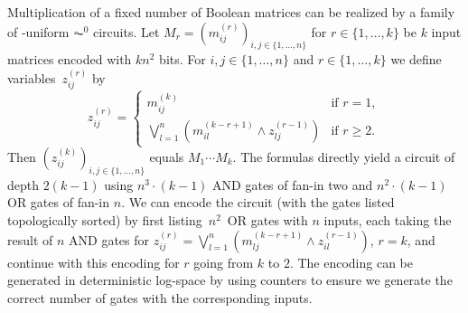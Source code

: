 \begin{example} \label{prelim:circuit:ex:AC0mtx}
	Multiplication of a fixed number of Boolean matrices can be realized by a family of \LOGSPACE-uniform 
	$\AC^0$ circuits.
	Let $M_r = (m_{ij}^{(r)})_{i,j\in \{1,\ldots,n\}}$
	for $r \in \{1,\ldots,k\}$ be $k$ input matrices
	encoded with $kn^2$ bits.	
	For $i,j \in \{1,\ldots,n\}$ and  $r \in \{1,\ldots,k\}$ 
	we define variables~$z_{ij}^{(r)}$
	by 
	\[
	z_{ij}^{(r)} = 
	\begin{cases}
		m_{ij}^{(k)} & \text{if } r = 1, \\
		\bigvee_{l=1}^n \left( m_{il}^{(k - r + 1)} \land  z_{lj}^{(r-1)} \right) & \text{if } r \ge 2.
	\end{cases}
	\]
	Then $\left( z_{ij}^{(k)} \right)_{i,j \in \{1,\ldots,n\}}$
	equals $M_1 \cdots M_k$.
	The formulas directly yield a circuit of depth $2(k-1)$ 
	using $n^3 \cdot (k - 1)$ AND gates of fan-in two and $n^2 \cdot (k-1)$ OR gates of fan-in $n$. 	
	We can encode the circuit (with the gates listed topologically sorted) 
	by first listing~$n^2$~OR gates with $n$ inputs, each taking the result of $n$ AND gates
	for $z_{ij}^{(r)} = \bigvee_{l=1}^n \left( m_{lj}^{(k - r + 1)} \land  z_{il}^{(r-1)} \right)$, $r = k$,
	and continue with this encoding for $r$ going from $k$ to $2$.
	The encoding can be generated in deterministic log-space by using counters to ensure we generate the correct number
	of gates with the corresponding inputs.
\end{example} 

